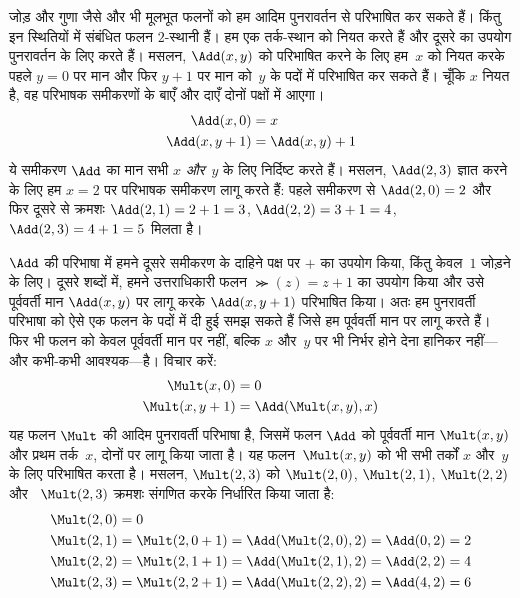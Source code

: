 \documentclass[../../../include/open-logic-section]{subfiles}
\begin{document}
जोड़ और गुणा जैसे और भी मूलभूत फलनों को हम आदिम पुनरावर्तन से परिभाषित
कर सकते हैं। किंतु इन स्थितियों में संबंधित फलन $2$-स्थानी हैं। हम एक
तर्क-स्थान को नियत करते हैं और दूसरे का उपयोग पुनरावर्तन के लिए करते हैं।
मसलन, $\Add(x, y)$ को परिभाषित करने के लिए हम~$x$ को नियत करके पहले
$y=0$ पर मान और फिर $y+1$ पर मान को~$y$ के पदों में परिभाषित कर सकते हैं।
चूँकि $x$ नियत है, वह परिभाषक समीकरणों के बाएँ और दाएँ दोनों पक्षों में
आएगा।
\begin{align*}
\Add(x,0) & =  x\\
\Add(x,y+1) & =  \Add(x,y)+1
\end{align*}
ये समीकरण $\Add$ का मान सभी $x$ \emph{और}~$y$ के लिए निर्दिष्ट करते
हैं। मसलन, $\Add(2,3)$ ज्ञात करने के लिए हम $x = 2$ पर परिभाषक समीकरण
लागू करते हैं: पहले समीकरण से $\Add(2,0) = 2$ और फिर दूसरे से क्रमशः
$\Add(2,1) = 2 + 1 = 3$, $\Add(2, 2) = 3 + 1 = 4$, $\Add(2,
3) = 4 + 1 = 5$ मिलता है।

$\Add$ की परिभाषा में हमने दूसरे समीकरण के दाहिने पक्ष पर $+$ का उपयोग
किया, किंतु केवल~$1$ जोड़ने के लिए। दूसरे शब्दों में, हमने उत्तराधिकारी
फलन $\Succ(z) = z+1$ का उपयोग किया और उसे पूर्ववर्ती मान
$\Add(x,y)$ पर लागू करके $\Add(x,y+1)$ परिभाषित किया। अतः हम पुनरावर्ती
परिभाषा को ऐसे एक फलन के पदों में दी हुई समझ सकते हैं जिसे हम पूर्ववर्ती
मान पर लागू करते हैं। फिर भी फलन को केवल पूर्ववर्ती मान पर नहीं, बल्कि
$x$ और~$y$ पर भी निर्भर होने देना हानिकर नहीं---और कभी-कभी आवश्यक---है।
विचार करें:
\begin{align*}
  \Mult(x,0) & =  0 \\
  \Mult(x,y+1) & =  \Add(\Mult(x,y),x)
\end{align*}
यह फलन $\Mult$ की आदिम पुनरावर्ती परिभाषा है, जिसमें फलन $\Add$ को
पूर्ववर्ती मान $\Mult(x,y)$ और प्रथम तर्क~$x$, दोनों पर लागू किया जाता है।
यह फलन~$\Mult(x,y)$ को भी सभी तर्कों $x$ और~$y$ के लिए परिभाषित करता है।
मसलन, $\Mult(2,3)$ को $\Mult(2,0)$, $\Mult(2,1)$, $\Mult(2,2)$ और
~$\Mult(2,3)$ क्रमशः संगणित करके निर्धारित किया जाता है:
\begin{align*}
  \Mult(2,0) & = 0\\
  \Mult(2,1) & = \Mult(2,0+1) =
  \Add(\Mult(2,0), 2) = \Add(0, 2) = 2\\
  \Mult(2,2) & = \Mult(2,1+1) =
  \Add(\Mult(2,1), 2) = \Add(2, 2) = 4\\
  \Mult(2,3) & = \Mult(2,2+1) =
  \Add(\Mult(2,2), 2) = \Add(4, 2) = 6
\end{align*}
\end{document}
